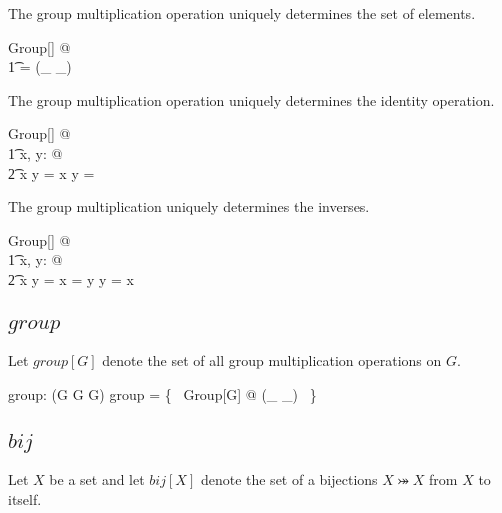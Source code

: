 \documentclass[11pt, oneside]{article}
\begin{document}
\begin{remark}
The group multiplication operation uniquely determines the set of elements.

\begin{zed}
	\forall Group[\setX] @ \\
	\t1	\setX = \ran (\_ \gmul \_)
\end{zed}

\end{remark}

\begin{remark}
The group multiplication operation uniquely determines the identity operation.

\begin{zed}
	\forall Group[\setX] @ \\
	\t1	\forall x, y: \setX @ \\
	\t2		x \gmul y = x \implies y = \gone
\end{zed}

\end{remark}

\begin{remark}
The group multiplication uniquely determines the inverses.

\begin{zed}
	\forall Group[\setX] @ \\
	\t1	\forall x, y: \setX @ \\
	\t2		x \gmul y = \gone \implies x = y \ginv \land y = x \ginv
\end{zed}

\end{remark}

\subsection{$group$}

Let $group[G]$ denote the set of all group multiplication operations on $G$.

\begin{gendef}[G]
	group: \power(G \cross G \fun G)
\where
	group = \{~ Group[G] @ (\_ \gmul \_) ~\}
\end{gendef}

\subsection{$bij$}

Let $X$ be a set and let $bij[X]$ denote the set of a bijections $X \bij X$ from $X$ to itself.
\end{document}
